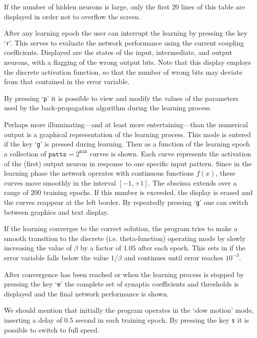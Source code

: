 If the number of hidden neurons is large, only the first 20 lines of this table are displayed in order not to overflow the screen.

After any learning epoch the user can interrupt the learning by pressing the key `\texttt{r}'. This serves to evaluate the network performance using the current coupling coefficients. Displayed are the states of the input, intermediate, and output neurons, with a flagging of the wrong output bits. Note that this display employs the discrete activation function, so that the number of wrong bits may deviate from that contained in the error variable.

By pressing `\texttt{p}' it is possible to view and modify the values of the parameters used by the back-propagation algorithm during the learning process.

Perhaps more illuminating---and at least more entertaining---than the numerical output is a graphical representation of the learning process. This mode is entered if the key `\texttt{g}' is pressed during learning. Then as a function of the learning epoch a collection of $\texttt{patts}=2^{\texttt{nin}}$ curves is shown. Each curve represents the activation of the (first) output neuron in response to one specific input pattern. Since in the learning phase the network operates with continuous functions $f(x)$, these curves move smoothly in the interval $[-1,+1]$. The abscissa extends over a range of 200 training epochs. If this number is exceeded, the display is erased and the curves reappear at the left border. By repeatedly pressing `\texttt{g}' one can switch between graphics and text
display.

If the learning converges to the correct solution, the program tries to make a smooth transition to the discrete (i.e. theta-function) operating mode by slowly increasing the value of $\beta$ by a factor of $1.05$ after each epoch. This sets in if the error variable falls below the value $1/\beta$ and continues until error reaches $10^{-3}$.

After convergence has been reached or when the learning process is stopped by pressing the key `\texttt{e}' the complete set of synaptic coefficients and thresholds is displayed and the final network performance is shown.

We should mention that initially the program operates in the `slow motion' mode, inserting a delay of $0.5$ second in each training epoch. By pressing the key \texttt{s} it is possible to switch to full speed.
